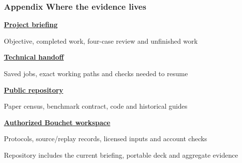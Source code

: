\documentclass[aspectratio=169,10pt,xcolor=table]{beamer}
\begin{document}
\begin{frame}[t]
\frametitle{Appendix \textperiodcentered{} Where the evidence lives}
\relax
{\normalsize\bfseries\href{https://github.com/Sasha-Cui/alpha-agent-replication/blob/main/docs/PROJECT_BRIEFING.md}{Project briefing}}\par
{\small\color{Muted} Objective, completed work, four-case review and unfinished work}\par\medskip
{\normalsize\bfseries\href{https://github.com/Sasha-Cui/alpha-agent-replication/blob/main/docs/RESEARCH_HANDOFF.md}{Technical handoff}}\par
{\small\color{Muted} Saved jobs, exact working paths and checks needed to resume}\par\medskip
{\normalsize\bfseries\href{https://github.com/Sasha-Cui/alpha-agent-replication}{Public repository}}\par
{\small\color{Muted} Paper census, benchmark contract, code and historical guides}\par\medskip
{\normalsize\bfseries\href{https://ood-bouchet.ycrc.yale.edu/pun/sys/dashboard/files/fs//nfs/roberts/project/pi_jss233/zc362/alpha_evolve/artifacts/native_monthly_implementation_v2_20261116}{Authorized Bouchet workspace}}\par
{\small\color{Muted} Protocols, source/replay records, licensed inputs and account checks}\par\medskip
{\scriptsize\color{Muted} Repository includes the current briefing, portable deck and aggregate evidence}\par\medskip
{}
\end{frame}
\end{document}
